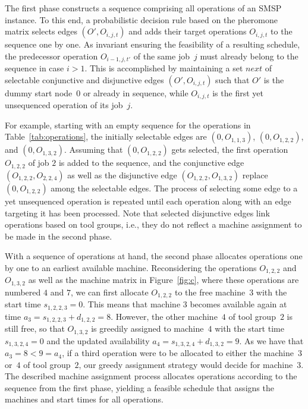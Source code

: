\documentclass[runningheads]{llncs}
\begin{document}
The first phase constructs a sequence comprising all operations
of an SMSP instance.
To this end, a probabilistic decision rule based on the pheromone
matrix selects edges $(O',O_{i,j,t})$
and adds their target operations $O_{i,j,t}$
to the sequence one by one.
As invariant ensuring the feasibility of a resulting schedule,
the predecessor operation $O_{i-1,j,t'}$ of the same job~$j$
must already belong to the sequence in case $i>1$.
This is accomplished by maintaining a set $\mathit{next}$
of selectable conjunctive and disjunctive edges $(O',O_{i,j,t})$
such that $O'$ is the dummy start node~$0$ or already in sequence,
while $O_{i,j,t}$ is the first yet unsequenced operation of its job~$j$.


For example, starting with an empty sequence for the operations
in Table~\ref{tab:operations},
the initially selectable edges are
$(0,O_{1,1,3})$, $(0,O_{1,2,2})$, and $(0,O_{1,3,2})$.
Assuming that $(0,O_{1,2,2})$ gets selected,
the first operation $O_{1,2,2}$ of job $2$ is added to the sequence,
and the conjunctive edge $(O_{1,2,2},O_{2,2,4})$ as well as the
disjunctive edge $(O_{1,2,2},O_{1,3,2})$ replace $(0,O_{1,2,2})$
among the selectable edges.
The process of selecting some edge to a yet unsequenced operation
is repeated until each operation along with an edge targeting it
has been processed.
Note that selected disjunctive edges link operations based on tool groups,
i.e., they do not reflect a machine assignment to be made in the second phase.

With a sequence of operations at hand,
the second phase allocates operations one by one to an earliest
available machine.
Reconsidering the operations $O_{1,2,2}$ and $O_{1,3,2}$ as well as the machine matrix in Figure~\ref{fig:c}, where these operations are numbered $4$ and $7$,
we can first allocate $O_{1,2,2}$ to the free machine~$3$ with
the start time $s_{1,2,2,3}=0$.
This means that machine $3$ becomes available again at time
$a_3 = s_{1,2,2,3} + d_{1,2,2} = 8$.
However, the other machine~$4$ of tool group~$2$ is still free, so that
$O_{1,3,2}$ is greedily assigned to machine~$4$ with the start time
$s_{1,3,2,4}=0$ and the updated availability
$a_4 = s_{1,3,2,4} + d_{1,3,2} = 9$.
As we have that $a_3=8<9=a_4$,
if a third operation were to be allocated to either the machine~$3$
or~$4$ of tool group~$2$,
our greedy assignment strategy would decide for machine~$3$.
The described machine assignment process allocates operations
according to the sequence from the first phase, yielding a
feasible schedule that assigns the machines and start times for all operations.
\end{document}
